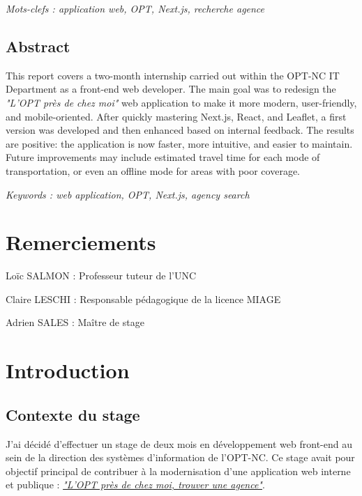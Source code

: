 \documentclass[12pt,a4paper]{report}
\begin{document}
\vspace{1cm}
\textit{Mots-clefs : application web, OPT, Next.js, recherche agence}

\section*{Abstract}
This report covers a two-month internship carried out within the OPT-NC IT Department as a front-end web developer.  
The main goal was to redesign the \textit{"L’OPT près de chez moi"} web application to make it more modern, user-friendly, and mobile-oriented.  
After quickly mastering Next.js, React, and Leaflet, a first version was developed and then enhanced based on internal feedback.  
The results are positive: the application is now faster, more intuitive, and easier to maintain.  
Future improvements may include estimated travel time for each mode of transportation, or even an offline mode for areas with poor coverage.

\vspace{1cm}
\textit{Keywords : web application, OPT, Next.js, agency search}

\chapter*{Remerciements}
Loïc SALMON : Professeur tuteur de l'UNC

\vspace{1cm}
Claire LESCHI : Responsable pédagogique de la licence MIAGE

\vspace{1cm}
Adrien SALES : Maître de stage

\newpage

\tableofcontents
\newpage

\chapter{Introduction}
\section{Contexte du stage}
J'ai décidé d'effectuer un stage de deux mois en développement web front-end au sein de la direction des systèmes d’information de l’OPT-NC. Ce stage avait pour objectif principal de contribuer à la modernisation d’une application web interne et publique : \textit{\href{https://www.opt.nc/service/l-opt-pres-de-chez-moi-trouver-une-agence}{"L'OPT près de chez moi, trouver une agence"}}.
\end{document}
